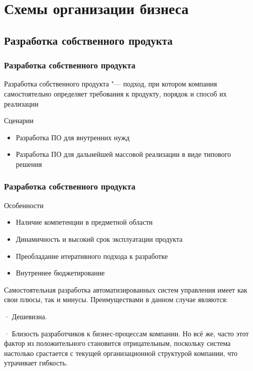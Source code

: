 \documentclass{../industrial-development}
\begin{document}
\section{Схемы организации бизнеса}

\subsection{Разработка собственного продукта}


\begin{frame} \frametitle{Разработка собственного продукта}
	\begin{block}{}
		\alert{Разработка собственного продукта} "--- подход, при котором компания самостоятельно определяет требования к продукту, порядок и способ их реализации
	\end{block}
	\begin{block}{Сценарии}
		\begin{itemize}
			\item Разработка ПО для внутренних нужд
			\item Разработка ПО для дальнейшей массовой реализации в виде типового решения
		\end{itemize}
	\end{block}
\end{frame}
\lecturenotes



\begin{frame} \frametitle{Разработка собственного продукта}
	\begin{block}{Особенности}
		\begin{itemize}
			\item Наличие компетенции в предметной области
			\item Динамичность и высокий срок эксплуатации продукта
			\item Преобладание итеративного подхода к разработке
			\item Внутреннее бюджетирование
		\end{itemize}
	\end{block}
\end{frame}
\lecturenotes
Самостоятельная разработка автоматизированных систем управления имеет как свои плюсы, так и минусы. Преимуществами в данном случае являются:

· Дешевизна.

· Близость разработчиков к бизнес-процессам компании. Но всё же, часто этот фактор из положительного становится отрицательным, поскольку система настолько срастается с текущей организационной структурой компании, что утрачивает гибкость.
\end{document}
